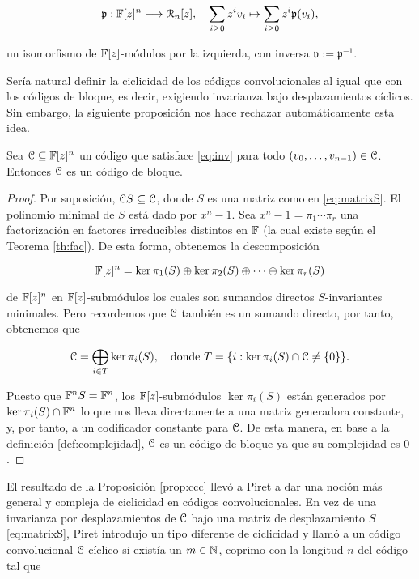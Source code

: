 $$\mathfrak{p}: \mathbb{F}[z]^n \longrightarrow \mathcal{R}_n[z], \quad \sum_{i \geq 0} z^iv_i \mapsto \sum_{i \geq 0}z^i\mathfrak{p}(v_i),$$

un isomorfismo de $\mathbb{F}[z]$-módulos por la izquierda, con inversa $\mathfrak{v} := \mathfrak{p}^{-1}$.

Sería natural definir la ciclicidad de los códigos convolucionales al igual que con los códigos de bloque, es decir, exigiendo invarianza bajo desplazamientos cíclicos. Sin embargo, la siguiente proposición nos hace rechazar automáticamente esta idea.

\begin{proposicion}\cite[p. 194]{cccheide}\label{prop:ccc}
Sea $\mathcal C \subseteq \mathbb{F}[z]^n$ un código que satisface \eqref{eq:inv} para todo $(v_0,\dots,v_{n-1}) \in \mathcal C$. Entonces $\mathcal C$ es un código de bloque.
\end{proposicion}

\begin{proof}
Por suposición, $\mathcal C S \subseteq \mathcal C$, donde $S$ es una matriz como en \eqref{eq:matrixS}. El polinomio minimal de $S$ está dado por $x^n - 1$. Sea $x^n - 1 = \pi_1 \cdots \pi_r$ una factorización en factores irreducibles distintos en $\mathbb{F}$ (la cual existe según el Teorema \ref{th:fac}). De esta forma, obtenemos la descomposición

$$\mathbb{F}[z]^n = \ker \pi_1(S) \oplus \ker \pi_2(S) \oplus \cdots \oplus \ker \pi_r(S)$$

de $\mathbb{F}[z]^n$ en $\mathbb{F}[z]$-submódulos los cuales son sumandos directos $S$-invariantes minimales. Pero recordemos que $\mathcal C$ también es un sumando directo, por tanto, obtenemos que 

$$\mathcal C = \bigoplus_{i \in T}\ker \pi_i(S), \quad \text{donde } T = \{i : \ker \pi_i(S) \cap \mathcal C \neq \{0\}\}.$$

Puesto que $\mathbb{F}^nS = \mathbb{F}^n$, los $\mathbb{F}[z]$-submódulos $\ker \pi_i(S)$ están generados por $\ker \pi_i(S) \cap \mathbb{F}^n$ lo que nos lleva directamente a una matriz generadora constante, y, por tanto, a un codificador constante para $\mathcal C$. De esta manera, en base a la definición \ref{def:complejidad}, $\mathcal C$ es un código de bloque ya que su complejidad es $0$.
\end{proof}

El resultado de la Proposición \ref{prop:ccc} llevó a Piret \cite{Piret} a dar una noción más general y compleja de ciclicidad en códigos convolucionales. En vez de una invarianza por desplazamientos de $\mathcal C$ bajo una matriz de desplazamiento $S$ \eqref{eq:matrixS}, Piret introdujo un tipo diferente de ciclicidad y llamó a un código convolucional $\mathcal C$ cíclico si existía un $m \in \mathbb{N}$, coprimo con la longitud $n$ del código tal que 

